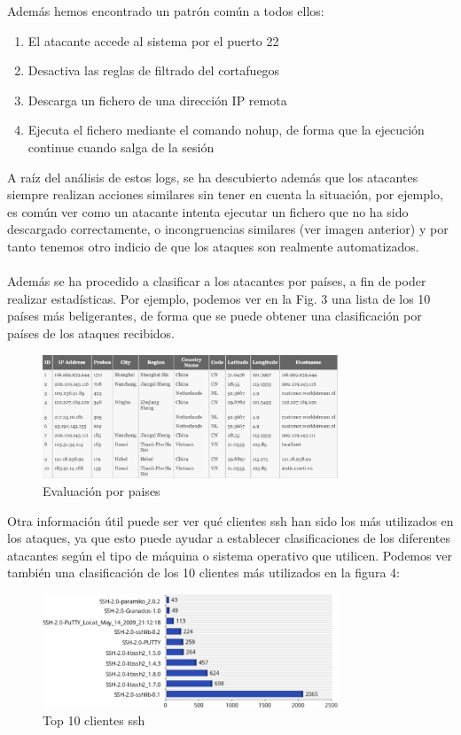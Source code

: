 \documentclass[journal]{IEEEtran}
\begin{document}
Además hemos encontrado un patrón común a todos ellos:
\begin{enumerate}
\item El atacante accede al sistema por el puerto 22
\item Desactiva las reglas de filtrado del cortafuegos
\item Descarga un fichero de una dirección IP remota
\item Ejecuta el fichero mediante el comando nohup, de forma que la ejecución continue cuando salga de la sesión
\end{enumerate}
A raíz del análisis de estos logs, se ha descubierto además que los atacantes siempre realizan acciones similares sin tener en cuenta la situación, por ejemplo, es común ver como un atacante intenta ejecutar un fichero que no ha sido descargado correctamente, o incongruencias similares (ver imagen anterior) y por tanto tenemos otro indicio de que los ataques son realmente automatizados.
\\\\
Además se ha procedido a clasificar a los atacantes por países, a fin de poder realizar estadísticas. Por ejemplo, podemos ver en la Fig. 3 una lista de los 10 países más beligerantes, de forma que se puede obtener una clasificación por países de los ataques recibidos.
\begin{figure}[H]
\centerline{
\includegraphics[width=8.8cm]{img/country_profiling}
}
\caption{Evaluación por paises}
\label{fig:sesion_atacante}
\end{figure}
Otra información útil puede ser ver qué clientes ssh han sido los más utilizados en los ataques, ya que esto puede ayudar a establecer clasificaciones de los diferentes atacantes según el tipo de máquina o sistema operativo que utilicen. Podemos ver también una clasificación de los 10 clientes más utilizados en la figura 4:
\begin{figure}[H]
\centerline{
\includegraphics[width=8.8cm]{img/ssh}
}
\caption{Top 10 clientes ssh }
\label{fig:sesion_atacante}
\end{figure}
\end{document}
